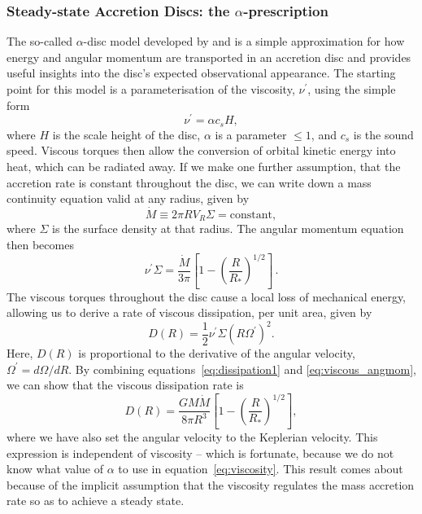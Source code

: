 \subsubsection{Steady-state Accretion Discs: the $\alpha$-prescription}

\label{sec:alpha_disc}

The so-called $\alpha$-disc model developed by 
\citet[][hereafter SS73]{shakurasunyaev1973} and \cite{lyndenbell1969} is
a simple approximation for how energy and angular momentum
are transported in an accretion disc and provides useful insights into
the disc's expected observational appearance. 
The starting point for this model is a parameterisation
of the viscosity, $\nu^\prime$, using the simple form
\begin{equation}
\nu^\prime = \alpha c_s H,
\label{eq:viscosity}
\end{equation}
where $H$ is the scale height of the disc,
$\alpha$ is a parameter $\leq 1$, and $c_s$ is the sound speed.
Viscous torques then allow the conversion of orbital kinetic energy into heat, 
which can be radiated away. 
If we make one further assumption, that the accretion rate is
constant throughout the disc, we can write down a mass continuity equation
valid at any radius, given by
\begin{equation}
\dot{M} \equiv 2 \pi R V_R \Sigma = \mathrm{constant},
\end{equation}
where $\Sigma$ is the surface density at that radius. 
The angular momentum equation then becomes
\begin{equation}
\nu^\prime \Sigma = \frac{\dot{M}}{3 \pi} \left[1 - \left( \frac{R}{R_*} \right)^{1/2} \right]\, .
\label{eq:viscous_angmom}
\end{equation}
The viscous torques throughout the disc cause a local loss of mechanical energy, allowing 
us to derive \citep[see, e.g.][]{fkrbook} a rate of viscous dissipation, 
per unit area, given by
\begin{equation}
D(R) = \frac{1}{2} \nu^\prime \Sigma (R \Omega^\prime)^2.
\label{eq:dissipation1}
\end{equation}
Here, $D(R)$ is proportional to the derivative of the angular velocity, $\Omega^\prime=d\Omega/dR$.
By combining equations~\ref{eq:dissipation1} and \ref{eq:viscous_angmom}, we can show that the 
viscous dissipation rate is 
\begin{equation}
D(R) = \frac{G M \dot{M}}{8 \pi R^3} \left[1 - \left( \frac{R}{R_*} \right)^{1/2} \right],
\label{eq:dissipation2}
\end{equation}
where we have also set the angular velocity to the Keplerian velocity. 
This expression is independent of viscosity -- which is fortunate, because
we do not know what value of $\alpha$ to use in equation~\ref{eq:viscosity}.
This result comes about because of the implicit assumption that the viscosity regulates
the mass accretion rate so as to achieve a steady state.

